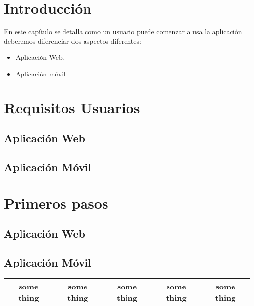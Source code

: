 
\section{Introducción}\label{introduccion-usuario}
En este capítulo se detalla como un usuario puede comenzar a usa la aplicación 
deberemos diferenciar dos aspectos diferentes:

\begin{itemize}
\tightlist
\item
  Aplicación Web. 
\item
  Aplicación móvil. \cite{accesodatos}
\end{itemize}

\section{Requisitos Usuarios}

\subsection{Aplicación Web}\label{aweb}

\subsection{Aplicación Móvil}\label{amovil}

\section{Primeros pasos}

\subsection{Aplicación Web}\label{aweb}

\subsection{Aplicación Móvil}\label{amovil}
\begin{tabular}{|c|c|c|c|c|}
  \hline
   some thing & some thing & some thing & some thing & some thing \\
  \hline
\end{tabular}





